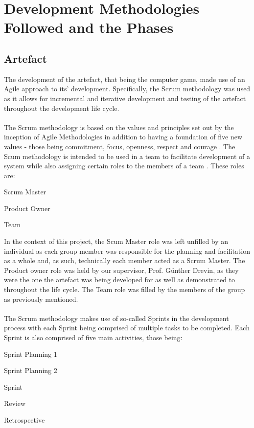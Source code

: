 \section{Development Methodologies Followed and the Phases}
\subsection{Artefact}
The development of the artefact, that being the computer game, made use of an Agile approach to its' development. Specifically, the Scrum methodology was used as it allows for incremental and iterative development and testing of the artefact throughout the development life cycle.
\\\\
The Scrum methodology is based on the values and principles set out by the inception of Agile Methodologies in addition to having a foundation of five new values - those being commitment, focus, openness, respect and courage \citep{scrumhermes}. The Scum methodology is intended to be used in a team to facilitate development of a system while also assigning certain roles to the members of a team \citep{scrumhermes}. These roles are:
\begin{itemize}
\begin{multicols}{3}
\item Scrum Master
\item Product Owner
\item Team
\end{multicols}
\end{itemize}
\noindent In the context of this project, the Scum Master role was left unfilled by an individual as
each group member was responsible for the planning and facilitation as a whole and, as such, technically each member acted as a Scrum Master. The Product owner role was held by our supervisor, Prof. Günther Drevin, as they were the one the artefact was being developed for as well as demonstrated to throughout the life cycle. The Team role was filled by the members of the group as previously mentioned.
\\\\
The Scrum methodology makes use of so-called Sprints in the development process with each Sprint being comprised of multiple tasks to be completed. Each Sprint is also comprised of five main activities, those being:
\begin{enumerate}
\begin{multicols}{2}
\item Sprint Planning 1
\item Sprint Planning 2
\item Sprint
\columnbreak
\raggedcolumns
\item Review
\item Retrospective
\end{multicols}
\end{enumerate}


